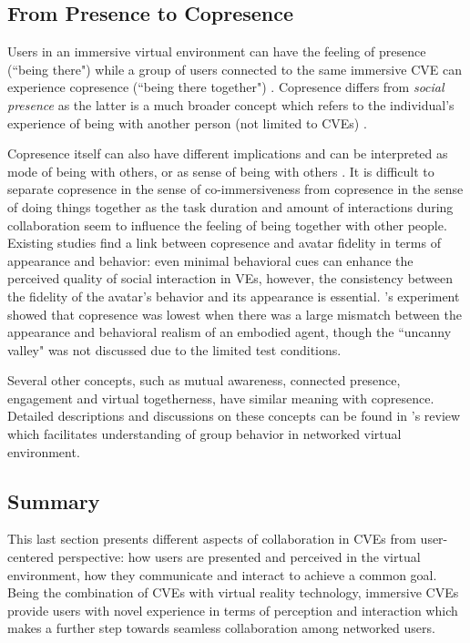 \subsection{From Presence to Copresence}
Users in an immersive virtual environment can have the feeling of presence (``being there") while a group of users connected to the same immersive CVE can experience copresence (``being there together") \citep{Slater2000Small}. Copresence differs from \textit{social presence} as the latter is a much broader concept which refers to the individual's experience of being with another person (not limited to CVEs) \citep{Schroeder2002Copresence}.

Copresence itself can also have different implications and can be interpreted as mode of being with others, or as sense of being with others \citep{Zhao2003Taxonomy}. It is difficult to separate copresence in the sense of co-immersiveness from copresence in the sense of doing things together \citep{Schroeder2002Copresence} as the task duration and amount of interactions during collaboration seem to influence the feeling of being together with other people. Existing studies \citep{Slater2002Meeting, Garau2003Thesis} find a link between copresence and avatar fidelity in terms of appearance and behavior: even minimal behavioral cues can enhance the perceived quality of social interaction in VEs, however, the consistency between the fidelity of the avatar's behavior and its appearance is essential. \citet{Bailenson2005Copresence}'s experiment showed that copresence was lowest when there was a large mismatch between the appearance and behavioral realism of an embodied agent, though the ``uncanny valley" was not discussed due to the limited test conditions.

Several other concepts, such as mutual awareness, connected presence, engagement and virtual togetherness, have similar meaning with copresence. Detailed descriptions and discussions on these concepts can be found in \citet{Schroeder2006Being}'s review which facilitates understanding of group behavior in networked virtual environment. 


\subsection{Summary}
This last section presents different aspects of collaboration in CVEs from user-centered perspective: how users are presented and perceived in the virtual environment, how they communicate and interact to achieve a common goal. Being the combination of CVEs with virtual reality technology, immersive CVEs provide users with novel experience in terms of perception and interaction which makes a further step towards seamless collaboration among networked users. 



